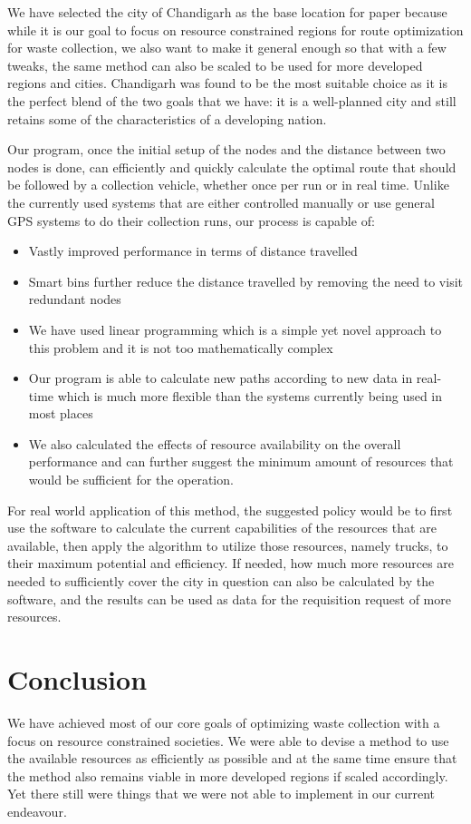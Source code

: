 \documentclass[12pt]{article}
\begin{document}
We have selected the city of Chandigarh as the base location for paper because while it is our goal to focus on resource constrained regions for route optimization for waste collection, we also want to make it general enough so that with a few tweaks, the same method can also be scaled to be used for more developed regions and cities. Chandigarh was found to be the most suitable choice as it is the perfect blend of the two goals that we have: it is a well-planned city and still retains some of the characteristics of a developing nation.

Our program, once the initial setup of the nodes and the distance between two nodes is done, can efficiently and quickly calculate the optimal route that should be followed by a collection vehicle, whether once per run or in real time. Unlike the currently used systems that are either controlled manually or use general GPS systems to do their collection runs, our process is capable of:
\begin{itemize}
    \item Vastly improved performance in terms of distance travelled
    \item Smart bins further reduce the distance travelled by removing the need to visit redundant nodes
    \item We have used linear programming which is a simple yet novel approach to this problem and it is not too mathematically complex
    \item Our program is able to calculate new paths according to new data in real-time which is much more flexible than the systems currently being used in most places
    \item We also calculated the effects of resource availability on the overall performance and can further suggest the minimum amount of resources that would be sufficient for the operation.
\end{itemize}

For real world application of this method, the suggested policy would be to first use the software to calculate the current capabilities of the resources that are available, then apply the algorithm to utilize those resources, namely trucks, to their maximum potential and efficiency. If needed, how much more resources are needed to sufficiently cover the city in question can also be calculated by the software, and the results can be used as data for the requisition request of more resources.

\section{Conclusion}
We have achieved most of our core goals of optimizing waste collection with a focus on resource constrained societies. We were able to devise a method to use the available resources as efficiently as possible and at the same time ensure that the method also remains viable in more developed regions if scaled accordingly. Yet there still were things that we were not able to implement in our current endeavour. 
\end{document}
